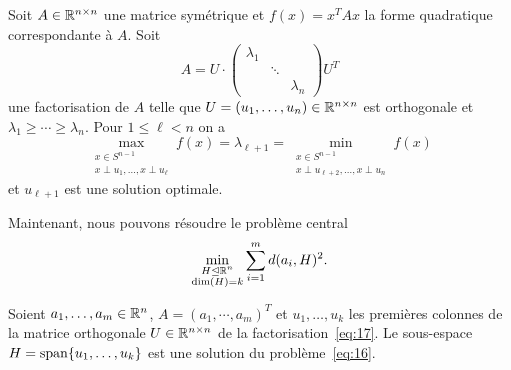 \begin{theorem}
\label{thr:25}
  Soit $A \in \mathbb{R}^{n\times n}$ une matrice symétrique et $f(x) = x^TAx$ la forme quadratique correspondante à $A$.
Soit 
\begin{displaymath}
  A = U \cdot
  \begin{pmatrix}
    \lambda_1\\
    & \ddots \\
    & & \lambda_n
  \end{pmatrix}
U^T
\end{displaymath}
une factorisation de $A$ telle que $U = (u_1,\dots,u_n) \in \mathbb{R}^{n \times n }$ est orthogonale et $\lambda_1 \geq \cdots \geq \lambda_n$. 
Pour $1 \leq \ell <n$ on a
  \begin{equation}
\label{eq:15}
    \max_{\substack{x \in S^{n-1} \\ x \perp u_1, \dots, x\perp u_\ell}} f(x) = \lambda_{\ell +1}  = \min_{\substack{x \in S^{n-1} \\ x \perp u_{\ell+2}, \dots, x\perp u_n}} f(x)
  \end{equation}
et $u_{\ell+1}$ est une solution optimale. 
\end{theorem}



Maintenant, nous pouvons résoudre le problème central 
\begin{equation}
  \label{eq:16}
  \min_{\substack{H \trianglelefteq \mathbb{R}^n \\ \dim(H) = k}} \sum_{i=1}^m d(a_i,H)^2. 
\end{equation}

\begin{theorem}
  \label{thr:26}
  Soient $a_1,\dots,a_m \in \mathbb{R}^n$,
$
    A =\left(
      a_1,\cdots ,a_m\right)^T
 $
  et $u_1,\dots,u_k$  les premières colonnes de la matrice orthogonale $U \in \mathbb{R}^{n \times n}$ de la factorisation~\eqref{eq:17}. Le sous-espace $H = \operatorname{span}\{u_1,\dots,u_k\}$ est une solution du problème~\eqref{eq:16}. 
\end{theorem}


